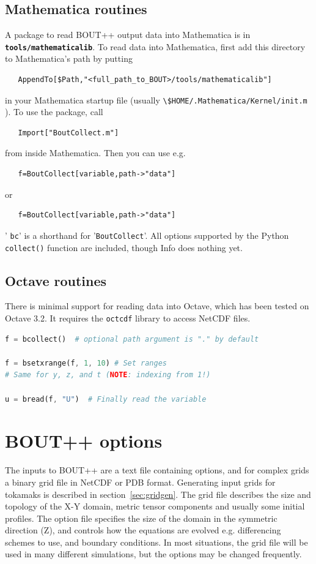 \documentclass[12pt]{article}
\newcommand{\file}[1]{\texttt{\bf #1}}
\begin{document}
\subsection{Mathematica routines}
%
A package to read BOUT++ output data into Mathematica is in
\file{tools/mathematicalib}.  To read data into Mathematica, first add this
directory to Mathematica's path by putting
%
\begin{verbatim}
   AppendTo[$Path,"<full_path_to_BOUT>/tools/mathematicalib"]
\end{verbatim}
%
in your Mathematica startup file (usually
%
\lstinline!\$HOME/.Mathematica/Kernel/init.m!
%
). To use the package, call
%
\begin{verbatim}
   Import["BoutCollect.m"]
\end{verbatim}
%
from inside Mathematica. Then you can use e.g.
%
\begin{verbatim}
   f=BoutCollect[variable,path->"data"]
\end{verbatim}
%
or
%
\begin{verbatim}
   f=BoutCollect[variable,path->"data"]
\end{verbatim}
%
'
%
\lstinline!bc!' is a shorthand for '\lstinline!BoutCollect!'. All options
supported by the Python \lstinline!collect()!
%
function are included, though Info does nothing yet.



\subsection{Octave routines}
%
There is minimal support for reading data into Octave, which has been tested on
Octave 3.2. It requires the \texttt{octcdf} library to access NetCDF files.

%
\begin{lstlisting}[language=octave,numbers=none]
f = bcollect()  # optional path argument is "." by default

f = bsetxrange(f, 1, 10) # Set ranges
# Same for y, z, and t (NOTE: indexing from 1!)

u = bread(f, "U")  # Finally read the variable
\end{lstlisting}
%





\section{BOUT++ options}
%
\label{sec:options}
%
%
The inputs to BOUT++ are a text file containing options, and for complex grids
a binary grid file in NetCDF or PDB format. Generating input grids for tokamaks
is described in section~\ref{sec:gridgen}. The grid file describes the size and
topology of the X-Y domain, metric tensor components and usually some initial
profiles. The option file specifies the size of the domain in the symmetric
direction (Z), and controls how the equations are evolved e.g. differencing
schemes to use, and boundary conditions.  In most situations, the grid file
will be used in many different simulations, but the options may be changed
frequently.
\end{document}
